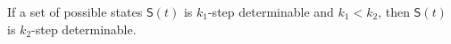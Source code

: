 \begin{lemma}
 If a set of possible states $\mathsf{S}(t)$ is $k_1$-step determinable and $k_1< k_2$, then $\mathsf{S}(t)$ is $k_2$-step determinable. %
  \label{lemm:2}
\end{lemma}


